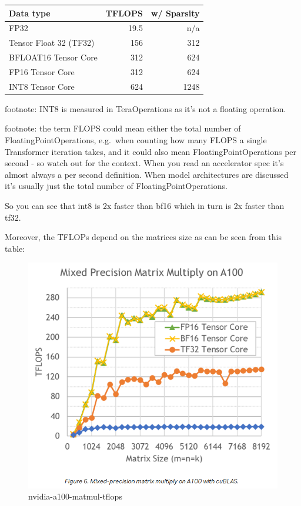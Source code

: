\documentclass[
]{report}
\begin{document}
\begin{longtable}[]{@{}lrr@{}}
\toprule\noalign{}
Data type & TFLOPS & w/ Sparsity \\
\midrule\noalign{}
\endhead
\bottomrule\noalign{}
\endlastfoot
FP32 & 19.5 & n/a \\
Tensor Float 32 (TF32) & 156 & 312 \\
BFLOAT16 Tensor Core & 312 & 624 \\
FP16 Tensor Core & 312 & 624 \\
INT8 Tensor Core & 624 & 1248 \\
\end{longtable}

footnote: INT8 is measured in TeraOperations as it's not a floating
operation.

footnote: the term FLOPS could mean either the total number of
FloatingPointOperations, e.g.~when counting how many FLOPS a single
Transformer iteration takes, and it could also mean
FloatingPointOperations per second - so watch out for the context. When
you read an accelerator spec it's almost always a per second definition.
When model architectures are discussed it's usually just the total
number of FloatingPointOperations.

So you can see that int8 is 2x faster than bf16 which in turn is 2x
faster than tf32.

Moreover, the TFLOPs depend on the matrices size as can be seen from
this table:

\begin{figure}[H]

{\centering \includegraphics{images/nvidia-a100-matmul-tflops.png}

}

\caption{nvidia-a100-matmul-tflops}

\end{figure}%
\end{document}
